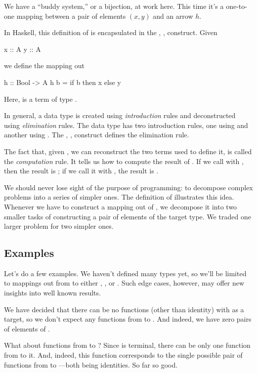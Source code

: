 \documentclass[DaoFP]{subfiles}
\begin{document}
We have a ``buddy system,'' or a bijection, at work here. This time it's a one-to-one mapping between a pair of elements $(x, y)$ and an arrow $h$. 

In Haskell, this definition of  is encapsulated in the , ,  construct. Given
\begin{haskell}
x :: A
y :: A
\end{haskell}
we define the mapping out
\begin{haskell}
h :: Bool -> A
h b = if b then x else y
\end{haskell}
Here,  is a term of type . 

In general, a data type is created using \emph{introduction} rules and deconstructed using \emph{elimination} rules. The  data type has two introduction rules, one using  and another using . The , ,  construct defines the elimination rule. 

The fact that, given , we can reconstruct the two terms used to define it, is called the \emph{computation} rule. It tells us how to compute the result of . If we call  with , then the result is ; if we call it with , the result is .

We should never lose sight of the purpose of programming: to decompose complex problems into a series of simpler ones. The definition of  illustrates this idea. Whenever we have to construct a mapping out of , we decompose it into two smaller tasks of constructing a pair of elements of the target type. We traded one larger problem for two simpler ones.

\subsection{Examples}

Let's do a few examples. We haven't defined many types yet, so we'll be limited to mappings out from  to either , \hask{()}, or . Such edge cases, however, may offer new insights into well known results.

We have decided that there can be no functions (other than identity) with  as a target, so we don't expect any functions from  to . And indeed, we have zero pairs of elements of . 

What about functions from  to \hask{()}? Since \hask{()} is terminal, there can be only one function from  to it. And, indeed, this function corresponds to the single possible pair of functions from \hask{()} to \hask{()}---both being identities. So far so good.
\end{document}
